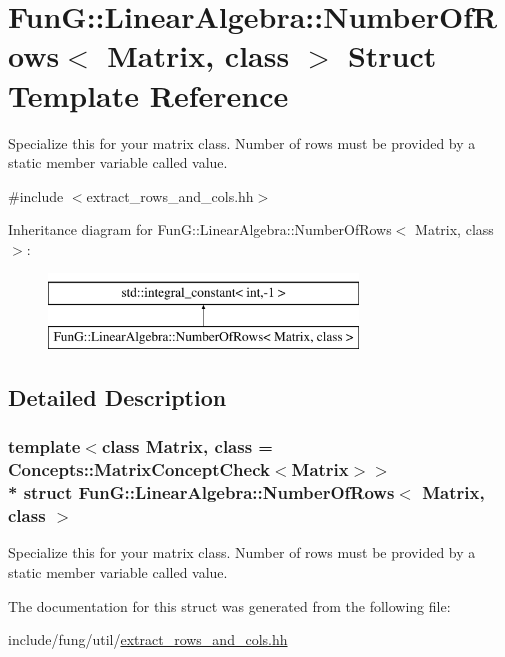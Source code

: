 \hypertarget{structFunG_1_1LinearAlgebra_1_1NumberOfRows}{}\section{FunG\+:\+:Linear\+Algebra\+:\+:Number\+Of\+Rows$<$ Matrix, class $>$ Struct Template Reference}
\label{structFunG_1_1LinearAlgebra_1_1NumberOfRows}


Specialize this for your matrix class. Number of rows must be provided by a static member variable called value.  




{\ttfamily \#include $<$extract\+\_\+rows\+\_\+and\+\_\+cols.\+hh$>$}

Inheritance diagram for FunG\+:\+:Linear\+Algebra\+:\+:Number\+Of\+Rows$<$ Matrix, class $>$\+:\begin{figure}[H]
\begin{center}
\leavevmode
\includegraphics[height=2.000000cm]{structFunG_1_1LinearAlgebra_1_1NumberOfRows}
\end{center}
\end{figure}


\subsection{Detailed Description}
\subsubsection*{template$<$class Matrix, class = Concepts\+::\+Matrix\+Concept\+Check$<$\+Matrix$>$$>$\\*
struct Fun\+G\+::\+Linear\+Algebra\+::\+Number\+Of\+Rows$<$ Matrix, class $>$}

Specialize this for your matrix class. Number of rows must be provided by a static member variable called value. 

The documentation for this struct was generated from the following file\+:\begin{DoxyCompactItemize}
\item 
include/fung/util/\hyperlink{extract__rows__and__cols_8hh}{extract\+\_\+rows\+\_\+and\+\_\+cols.\+hh}\end{DoxyCompactItemize}
